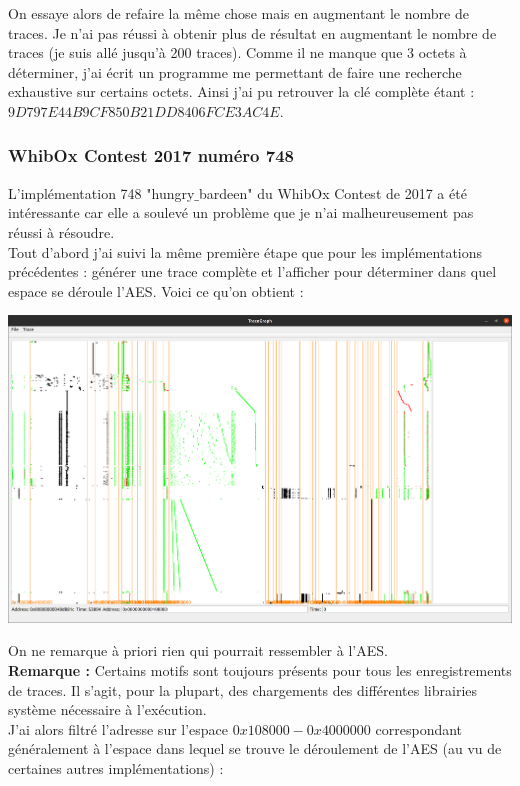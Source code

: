 \documentclass[10pt,a4paper]{article}
\begin{document}
On essaye alors de refaire la même chose mais en augmentant le nombre de traces. Je n'ai pas réussi à obtenir plus de résultat en augmentant le nombre de traces (je suis allé jusqu'à 200 traces). Comme il ne manque que 3 octets à déterminer, j'ai écrit un programme me permettant de faire une recherche exhaustive sur certains octets. Ainsi j'ai pu retrouver la clé complète étant : $9D797E44B9CF850B21DD8406FCE3AC4E$.

\subsubsection{WhibOx Contest 2017 numéro 748}
L'implémentation 748 "hungry$\_$bardeen" du WhibOx Contest de 2017 a été intéressante car elle a soulevé un problème que je n'ai malheureusement pas réussi à résoudre.\\
Tout d'abord j'ai suivi la même première étape que pour les implémentations précédentes : générer une trace complète et l'afficher pour déterminer dans quel espace se déroule l'AES. Voici ce qu'on obtient :

\begin{center}
\includegraphics[scale=0.11]{Images/748_sans_filtre.png}\\
\end{center}
On ne remarque à priori rien qui pourrait ressembler à l'AES.\\
\textbf{Remarque :} Certains motifs sont toujours présents pour tous les enregistrements de traces. Il s'agit, pour la plupart, des chargements des différentes librairies système nécessaire à l'exécution.\\
J'ai alors filtré l'adresse sur l'espace $0x108000-0x4000000$ correspondant généralement à l'espace dans lequel se trouve le déroulement de l'AES (au vu de certaines autres implémentations) :
\end{document}
